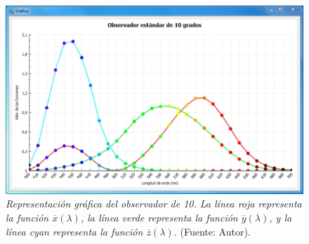 	\begin{figure}[H]
		\centering
		\includegraphics[scale=0.6]{img/curva-observador.jpg}
			\caption[Representaci\'{o}n gr\'{a}fica del observador de 10\degree]{\textit{Representaci\'{o}n gr\'{a}fica del observador de 10\degree. La l\'{i}nea roja representa la funci\'{o}n $\overline{x}(\lambda)$, la l\'{i}nea verde representa la funci\'{o}n $\overline{y}(\lambda)$, y la l\'{i}nea cyan representa la funci\'{o}n $\overline{z}(\lambda)$.} (Fuente: Autor).}
	\end{figure}
		